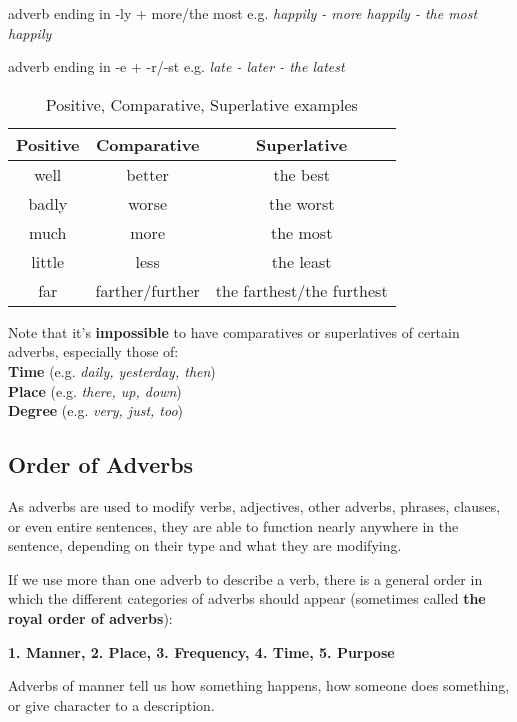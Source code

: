 \documentclass[hidelinks,10pt,a4paper]{article}
\begin{document}
adverb ending in -ly + more/the most
e.g. \textit{happily - more happily - the most happily}

adverb ending in -e + -r/-st
e.g. \textit{late - later - the latest}

\begin{table}[h]
\begin{center}
\begin{tabular}{|c|c|c|}
	\hline
	\textbf{Positive} & \textbf{Comparative} & \textbf{Superlative} \\ \hline
	well & better & the best \\ \hline
	badly & worse & the worst \\ \hline
	much & more & the most \\ \hline
	little & less & the least \\ \hline
	far & farther/further & the farthest/the furthest \\ \hline
\end{tabular}
\end{center}
\caption{Positive, Comparative, Superlative examples} \label{tab:csad2}
\end{table}

Note that it's \textbf{impossible} to have comparatives or superlatives of certain adverbs, especially those of:\\
\indent \textbf{Time} (e.g. \textit{daily, yesterday, then})\\
\indent \textbf{Place} (e.g. \textit{there, up, down})\\
\indent \textbf{Degree} (e.g. \textit{very, just, too})

\subsection{Order of Adverbs}
As adverbs are used to modify verbs, adjectives, other adverbs, phrases, clauses, or even entire sentences, they are able to function nearly anywhere in the sentence, depending on their type and what they are modifying.

If we use more than one adverb to describe a verb, there is a general order in which the different categories of adverbs should appear (sometimes called \textbf{the royal order of adverbs}):

\begin{center}
	\textbf{1. Manner, 2. Place, 3. Frequency, 4. Time, 5. Purpose}
\end{center}

Adverbs of manner tell us how something happens, how someone does something, or give character to a description.
\end{document}
